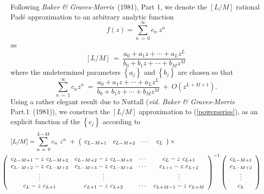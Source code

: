 Following {\em Baker \& Graves-Morris\/}~(1981), Part 1,  we denote the  
$\left[{L/M}\right]$ rational Pad\'{e} approximation to an arbitrary 
analytic function  
\[
f(z)=\sum\limits_{ n\ =\ 0}^{ \infty } { c}_{ n}\ {z}^{n}
\]
as
\[
\left[{L/M}\right]\ =\ {\frac{{a}_{0}+{a}_{1}z+\cdots 
+{a}_{L}{z}^{L}}{{b}_{0}+{b}_{1}z+\cdots +{b}_{M}{z}^{M}}}
\] 
where the undetermined parameters $\left\{ {a}_{j}\right\} $ and 
$\left\{ {b}_{j}\right\} $ are chosen so that
\begin{equation} \label{powerseries}
 \sum\limits_{ n\ =\ 1}^{ \infty } { c}_{ n}{z}^{n}\ =\ 
 {\frac{{a}_{0}+{a}_{1}z+\cdots +{a}_{L}{z}^{L}}
 {{b}_{0}+{b}_{1}z+\cdots +{b}_{M}{z}^{M}}}\ +\ 
 O\left({{z}^{L+M+1}}\right).
\end{equation} 
Using a rather elegant result due to Nuttall ({\em vid. Baker \& 
Graves-Morris \/} Part.1~(1981)), we  construct the
$\left[{L/M}\right]$ approximation to (\ref{powerseries}), as an explicit 
function of the
 $\left\{ {c}_{j}\right\} $ according to
\begin{eqnarray} \label{nuttalform}
\lefteqn{\left[{L/M}\right]=  \sum\limits_{ n\ =\ 0}^{ L-M} 
{ c}_{ n} \ {z}^{n}\ +\ 
\left({\begin{array}{cccc}{c}_{L-M+1}&{c}_{L-M+2}&\cdots 
&{c}_{L}\end{array}}\right) \times} \nonumber\\
&&
\!\!\!\!\!\!\!\!\!\!\!\!\!\!
{\left({\begin{array}{cccc}{c}_{L-M+1}-z\ {c}_{L-M+2}&{c}_{L-M+2}-z\ 
{c}_{L-M+3}&\cdots &{c}_{L}-z\ {c}_{L+1}\\ {c}_{L-M+2}-z\ 
{c}_{L-M+3}&{c}_{L-M+3}-z\ {c}_{L-M+4}&\cdots &{c}_{L+1}-z\ {c}_{L+2}\\ 
\vdots&\vdots&&\vdots\\ {c}_{L}-z\ {c}_{L+1}&{c}_{L+1}-z\ {c}_{L+2}&\cdots 
&{c}_{L+M-1}-z\ 
{c}_{L+M}\end{array}}\right)}^{-1}\left({\begin{array}{c}{c}_{L-M+1}\\ 
{c}_{L-M+2}\\ \vdots\\ {c}_{L}\end{array}}\right)\nonumber\\
&& 
\end{eqnarray}

